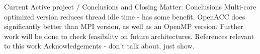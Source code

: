 \documentclass[9pt]{article}
\newcommand{\fontSize}{\tiny}
\begin{document}
\begin{outline}[enumerate]
\fontSize \1 { \fontSize Current Active project  / } 
\fontSize \1 {\fontSize Conclusions and Closing Matter:}
\fontSize \2 {\fontSize Conclusions}
  \fontSize \3 {\fontSize Multi-core optimized version reduces thread
    idle time - has some benefit.} 
  \fontSize \3 {\fontSize OpenACC does significantly better than MPI version, as
    well as an OpenMP version.} 
  \fontSize \3 {\fontSize Further work will be done to check feasibility on
    future architectures.}
\fontSize \2 {\fontSize References relevant to this work} 
\fontSize \2 {\fontSize Acknowledgements - don't talk about, just
  show. }  






\end{outline}
\end{document}
